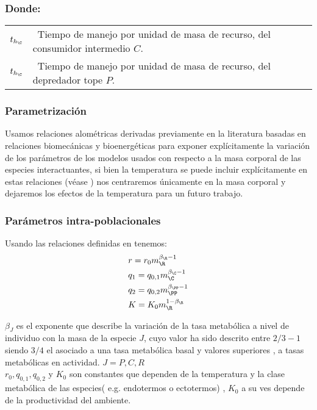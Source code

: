 \subsubsection*{Donde:}
\begin{tabular}{l@{:}l}
$t_{h_\C}$ & \  Tiempo de manejo por unidad de masa de recurso, del consumidor intermedio $C$.\\
$t_{h_\C}$ & \  Tiempo de manejo por  unidad de masa de recurso, del depredador tope $P$.\\
\end{tabular}

\subsubsection{Parametrizaci\'on}
Usamos relaciones alom\'etricas derivadas previamente en la literatura basadas en relaciones biomec\'anicas y bioenerg\'eticas \citep{savage2004predominance,brown2004toward,west1997general,savage2004effects,pawar2012dimensionality,mcgill2006allometric,peters1986ecological,kiltie2000scaling,yodzis1992body} para exponer expl\'icitamente la variaci\'on de los par\'ametros de los modelos usados con respecto a la masa corporal de las especies interactuantes,  si bien la temperatura se puede incluir expl\'icitamente en estas relaciones (v\'ease \citealt{brown2004toward,savage2004effects}) nos centraremos \'unicamente en la masa corporal y dejaremos los efectos de la temperatura para un futuro trabajo. 

\subsubsection{Par\'ametros intra-poblacionales}
Usando las relaciones definidas en \cite{savage2004effects} tenemos:
\begin{equation}\label{eq:params3}
\begin{aligned}
&r = r_0m_\R^{\beta_\R - 1} \\
&q_1=q_{0,1}m_\C^{\beta_\C - 1} \\
&q_2= q_{0,2}m_\PP^{\beta_\PP -1}\\
&K= K_{0}m_\R^{1-\beta_\R}
\end{aligned}
\end{equation}

$\beta_J$ es el exponente que describe la variaci\'on de la tasa metab\'olica a nivel de individuo con la masa de la especie $J$, cuyo valor ha sido descrito entre $2/3 - 1$ siendo $3/4$ el asociado a una tasa metab\'olica basal y valores superiores , a tasas metab\'olicas en actividad\citep{pawar2012dimensionality,west1997general,savage2004predominance}. $J = P,C,R$ \\
$r_0,q_{0,1},q_{0,2}$ y $K_0$ son constantes que dependen de la temperatura y la clase metab\'olica de las especies( e.g. endotermos o ectotermos) , $K_0$ a su ves depende de la productividad del ambiente\citep{pawar2012dimensionality}.
